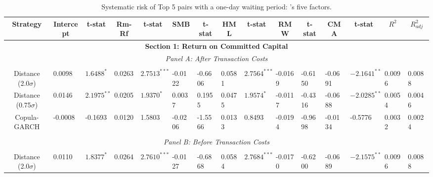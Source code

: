 \documentclass[a4paper]{article}
\begin{document}
\begin{sidewaystable}
	\caption{Systematic risk of Top 5 pairs with a one-day waiting period: \citet*{ff15}'s five factors.}
	\begin{threeparttable}[H]
		\centering \scriptsize
		\begin{tabularx}{\textwidth}{@{\extracolsep{\fill}}lllllllllllllll@{}}
			\toprule
			\multicolumn{1}{c}{Strategy} & \multicolumn{1}{c}{Intercept} & \multicolumn{1}{c}{t-stat} & \multicolumn{1}{c}{Rm-Rf} & \multicolumn{1}{c}{t-stat} & \multicolumn{1}{c}{SMB} & \multicolumn{1}{c}{t-stat} & \multicolumn{1}{c}{HML} & \multicolumn{1}{c}{t-stat} & \multicolumn{1}{c}{RMW} & \multicolumn{1}{c}{t-stat} & \multicolumn{1}{c}{CMA} & \multicolumn{1}{c}{t-stat} & \multicolumn{1}{c}{$R^{2}$} & \multicolumn{1}{c}{$R^{2}_{adj}$} \\
			\midrule
			\multicolumn{15}{c}{\textbf{Section 1: Return on Committed Capital}} \\
			\multicolumn{15}{c}{\textit{Panel A: After Transaction Costs}} \\
			\multicolumn{1}{c}{} & \multicolumn{1}{c}{} & \multicolumn{1}{c}{} & \multicolumn{1}{c}{} & \multicolumn{1}{c}{} & \multicolumn{1}{c}{} & \multicolumn{1}{c}{} & \multicolumn{1}{c}{} &       &       &       &       &       &       &  \\
			\multicolumn{1}{c}{Distance (2.0$\sigma$)} & 0.0098 & $1.6488^{*}$ & 0.0263 & $2.7513^{***}$ & -0.0122 & -0.6606 & 0.0581 & $2.7564^{***}$ & -0.0169 & -0.6150 & -0.0691 & $-2.1641^{**}$ & 0.0096 & 0.0088 \\
			\multicolumn{1}{c}{Distance (0.75$\sigma$)} & 0.0146 & $2.1975^{**}$ & 0.0205 & $1.9370^{*}$ & 0.0037 & 0.1955 & 0.0475 & $1.9574^{*}$ & -0.0117 & -0.4316 & -0.0688 & $-2.0285^{**}$ & 0.0054 & 0.0046 \\
			\multicolumn{1}{c}{Copula-GARCH} & -0.0008 & -0.1693 & 0.0120 & 1.5803 & -0.0206 & -1.5566 & 0.0133 & 0.8493 & -0.0194 & -0.9698 & -0.0134 & -0.5776 & 0.0032 & 0.0024 \\
			&       &       &       &       &       &       &       &       &       &       &       &       &       &  \\
			\multicolumn{15}{c}{\textit{Panel B: Before Transaction Costs}} \\
			&       &       &       &       &       &       &       &       &       &       &       &       &       &  \\
			\multicolumn{1}{c}{Distance (2.0$\sigma$)} & 0.0110 & $1.8377^{*}$ & 0.0264 & $2.7610^{***}$ & -0.0127 & -0.6868 & 0.0584 & $2.7684^{***}$ & -0.0170 & -0.6200 & -0.0689 & $-2.1575^{**}$ & 0.0096 & 0.0088 \\

\end{tabularx}
\end{threeparttable}
\end{sidewaystable}
\end{document}
